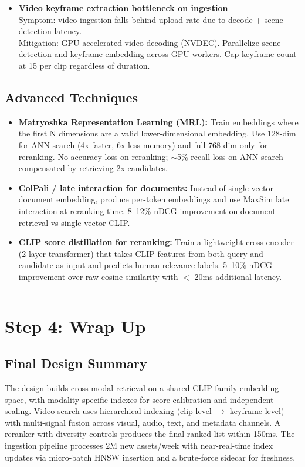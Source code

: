 \begin{itemize}
  \item \textbf{Video keyframe extraction bottleneck on ingestion}\\
    Symptom: video ingestion falls behind upload rate due to decode + scene detection latency.\\
    Mitigation: GPU-accelerated video decoding (NVDEC). Parallelize scene detection and keyframe embedding across GPU workers. Cap keyframe count at 15 per clip regardless of duration.
\end{itemize}

\subsection*{Advanced Techniques}

\begin{itemize}
  \item \textbf{Matryoshka Representation Learning (MRL):} Train embeddings where the first N dimensions are a valid lower-dimensional embedding. Use 128-dim for ANN search (4x faster, 6x less memory) and full 768-dim only for reranking. No accuracy loss on reranking; $\sim$5\% recall loss on ANN search compensated by retrieving 2x candidates.
  \item \textbf{ColPali / late interaction for documents:} Instead of single-vector document embedding, produce per-token embeddings and use MaxSim late interaction at reranking time. 8--12\% nDCG improvement on document retrieval vs single-vector CLIP.
  \item \textbf{CLIP score distillation for reranking:} Train a lightweight cross-encoder (2-layer transformer) that takes CLIP features from both query and candidate as input and predicts human relevance labels. 5--10\% nDCG improvement over raw cosine similarity with $<$ 20ms additional latency.
\end{itemize}

\bigskip\hrule\bigskip

\section*{Step 4: Wrap Up}

\subsection*{Final Design Summary}

The design builds cross-modal retrieval on a shared CLIP-family embedding space, with modality-specific indexes for score calibration and independent scaling. Video search uses hierarchical indexing (clip-level $\rightarrow$ keyframe-level) with multi-signal fusion across visual, audio, text, and metadata channels. A reranker with diversity controls produces the final ranked list within 150ms. The ingestion pipeline processes 2M new assets/week with near-real-time index updates via micro-batch HNSW insertion and a brute-force sidecar for freshness.

